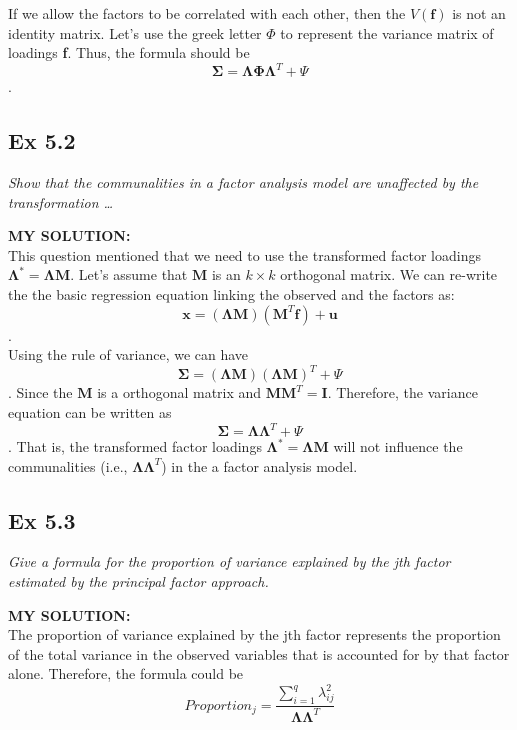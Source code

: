 \documentclass[
]{article}
\begin{document}
If we allow the factors to be correlated with each other, then the
\(V(\boldsymbol f)\) is not an identity matrix. Let's use the greek
letter \(\Phi\) to represent the variance matrix of loadings \textbf{f}.
Thus, the formula should be
\[\boldsymbol \Sigma = \boldsymbol\Lambda \boldsymbol \Phi \boldsymbol\Lambda^T + \Psi\].

\hypertarget{ex-5.2}{%
\subsection{Ex 5.2}\label{ex-5.2}}

\emph{Show that the communalities in a factor analysis model are
unaffected by the transformation \ldots{}}

\textbf{MY SOLUTION:}\\
This question mentioned that we need to use the transformed factor
loadings \(\boldsymbol \Lambda ^* = \boldsymbol \Lambda \boldsymbol M\).
Let's assume that \(\boldsymbol M\) is an \(k \times k\) orthogonal
matrix. We can re-write the the basic regression equation linking the
observed and the factors as:
\[\boldsymbol x=(\boldsymbol\Lambda \boldsymbol M)( \boldsymbol M^T \boldsymbol f) + \boldsymbol u\].\\
Using the rule of variance, we can have
\[\boldsymbol \Sigma = (\boldsymbol\Lambda \boldsymbol M)(\boldsymbol\Lambda \boldsymbol M)^T + \Psi\].
Since the \(\boldsymbol M\) is a orthogonal matrix and
\(\boldsymbol M \boldsymbol M^T = \boldsymbol I\). Therefore, the
variance equation can be written as
\[\boldsymbol \Sigma = \boldsymbol\Lambda \boldsymbol\Lambda^T + \Psi\].
That is, the transformed factor loadings
\(\boldsymbol \Lambda ^* = \boldsymbol \Lambda \boldsymbol M\) will not
influence the communalities (i.e.,
\(\boldsymbol\Lambda \boldsymbol\Lambda^T\)) in the a factor analysis
model.

\hypertarget{ex-5.3}{%
\subsection{Ex 5.3}\label{ex-5.3}}

\emph{Give a formula for the proportion of variance explained by the jth
factor estimated by the principal factor approach.}

\textbf{MY SOLUTION:}\\
The proportion of variance explained by the jth factor represents the
proportion of the total variance in the observed variables that is
accounted for by that factor alone. Therefore, the formula could be
\[Proportion_j = \frac {\sum_{i=1}^{q} \lambda_{ij}^2}{\boldsymbol \Lambda \boldsymbol \Lambda ^T}\]
\end{document}
